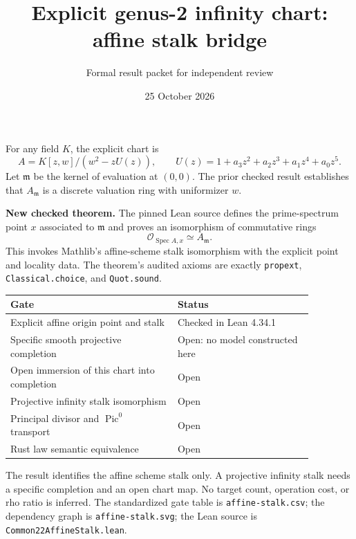 \documentclass[11pt]{article}
\title{Explicit genus-2 infinity chart: affine stalk bridge}
\author{Formal result packet for independent review}
\date{25 October 2026}
\begin{document}
\maketitle
For any field $K$, the explicit chart is
\[A=K[z,w]/(w^2-zU(z)),\qquad U(z)=1+a_3z^2+a_2z^3+a_1z^4+a_0z^5.\]
Let $\mathfrak m$ be the kernel of evaluation at $(0,0)$. The prior checked result establishes that $A_{\mathfrak m}$ is a discrete valuation ring with uniformizer $w$.

\medskip\noindent\textbf{New checked theorem.} The pinned Lean source defines the prime-spectrum point $x$ associated to $\mathfrak m$ and proves an isomorphism of commutative rings
\[\mathcal O_{\operatorname{Spec}A,x}\simeq A_{\mathfrak m}.\]
This invokes Mathlib's affine-scheme stalk isomorphism with the explicit point and locality data. The theorem's audited axioms are exactly \texttt{propext}, \texttt{Classical.choice}, and \texttt{Quot.sound}.

\begin{center}\begin{tabular}{p{0.48\linewidth}p{0.39\linewidth}}\toprule
Gate & Status\\\midrule
Explicit affine origin point and stalk & Checked in Lean 4.34.1\\
Specific smooth projective completion & Open: no model constructed here\\
Open immersion of this chart into completion & Open\\
Projective infinity stalk isomorphism & Open\\
Principal divisor and $\operatorname{Pic}^0$ transport & Open\\
Rust law semantic equivalence & Open\\\bottomrule\end{tabular}\end{center}

\noindent The result identifies the affine scheme stalk only. A projective infinity stalk needs a specific completion and an open chart map. No target count, operation cost, or rho ratio is inferred. The standardized gate table is \texttt{affine-stalk.csv}; the dependency graph is \texttt{affine-stalk.svg}; the Lean source is \texttt{Common22AffineStalk.lean}.
\end{document}
